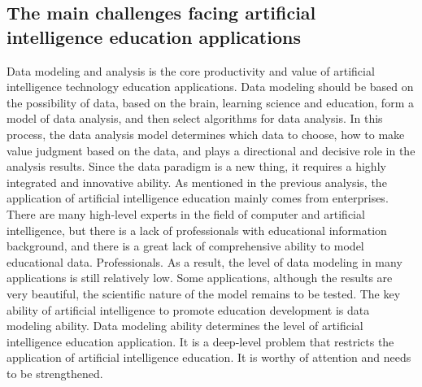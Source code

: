 \documentclass[11pt,en,authoryear]{elegantpaper}
\begin{document}
\subsection{The main challenges facing artificial intelligence education applications}
Data modeling and analysis is the core productivity and value of artificial intelligence technology education applications. Data modeling should be based on the possibility of data, based on the brain, learning science and education, form a model of data analysis, and then select algorithms for data analysis. In this process, the data analysis model determines which data to choose, how to make value judgment based on the data, and plays a directional and decisive role in the analysis results. Since the data paradigm is a new thing, it requires a highly integrated and innovative ability. As mentioned in the previous analysis, the application of artificial intelligence education mainly comes from enterprises. There are many high-level experts in the field of computer and artificial intelligence, but there is a lack of professionals with educational information background, and there is a great lack of comprehensive ability to model educational data. Professionals. As a result, the level of data modeling in many applications is still relatively low. Some applications, although the results are very beautiful, the scientific nature of the model remains to be tested.
The key ability of artificial intelligence to promote education development is data modeling ability. Data modeling ability determines the level of artificial intelligence education application. It is a deep-level problem that restricts the application of artificial intelligence education. It is worthy of attention and needs to be strengthened.
\end{document}
